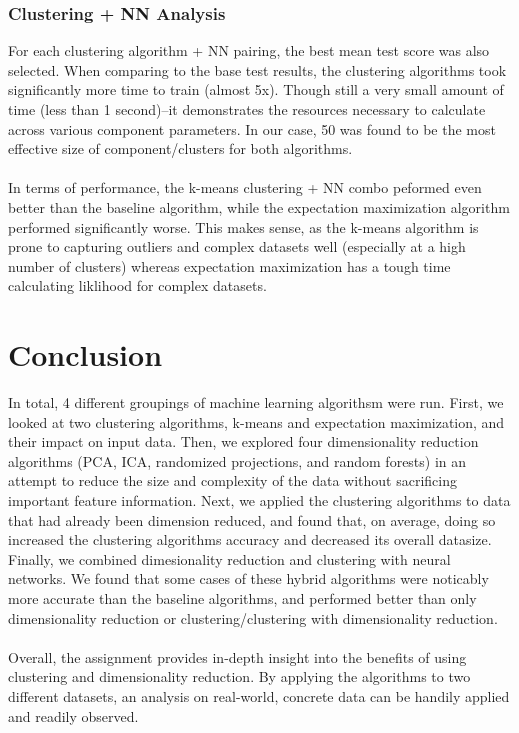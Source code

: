 \documentclass[h]{article}
\begin{document}
\subsubsection*{Clustering + NN Analysis}
For each clustering algorithm + NN pairing, the best mean test score was also 
selected.  When comparing to the base test results, the clustering algorithms 
took significantly more time to train (almost 5x).  Though still a very small 
amount of time (less than 1 second)--it demonstrates the resources necessary to 
calculate across various component parameters.  In our case, 50 was 
found to be the most effective size of component/clusters for both algorithms.
\\ \\
In terms of performance, the k-means clustering + NN combo peformed even better 
than the baseline algorithm, while the expectation maximization algorithm 
performed significantly worse.  This makes sense, as the k-means algorithm is 
prone to capturing outliers and complex datasets well (especially at a high number of clusters) 
whereas expectation maximization has a tough time calculating liklihood for 
complex datasets.

\section*{Conclusion}  
In total, 4 different groupings of machine learning algorithsm were run.  First, 
we looked at two clustering algorithms, k-means and expectation maximization, and 
their impact on input data.  Then, we explored four dimensionality reduction 
algorithms (PCA, ICA, randomized projections, and random forests) in an attempt 
to reduce the size and complexity of the data without sacrificing important 
feature information.  Next, we applied the clustering algorithms to data that 
had already been dimension reduced, and found that, on average, doing so 
increased the clustering algorithms accuracy and decreased its overall datasize. 
Finally, we combined dimesionality reduction and clustering with neural 
networks.  We found that some cases of these hybrid algorithms were noticably 
more accurate than the baseline algorithms, and performed better than only 
dimensionality reduction or 
clustering/clustering with dimensionality reduction.
\\ \\
Overall, the assignment provides in-depth insight into the benefits of using clustering 
and dimensionality reduction.  By applying the algorithms to two different 
datasets, an analysis on real-world, concrete data can be handily applied and 
readily 
observed.
\end{document}
